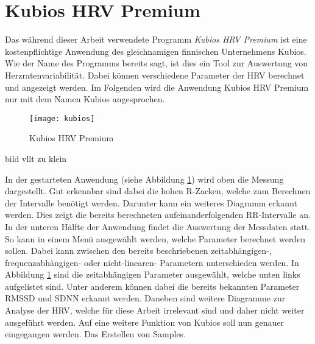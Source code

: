 \section{Kubios HRV Premium}
Das während dieser Arbeit verwendete Programm \textit{Kubios HRV Premium} ist eine kostenpflichtige Anwendung des gleichnamigen finnischen Unternehmens Kubios. Wie der Name des Programms bereits sagt, ist dies ein Tool zur Auswertung von Herzratenvariabilität. Dabei können verschiedene Parameter der HRV berechnet und angezeigt werden.
Im Folgenden wird die Anwendung Kubios HRV Premium nur mit dem Namen Kubios angesprochen. 
 \begin{figure}[H]
	\centering
	\texttt{[image: kubios]}
	\caption{Kubios HRV Premium}
	\label{fig:kubios}
\end{figure}
\todo bild vllt zu klein

In der gestarteten Anwendung (siehe Abbildung \ref{fig:kubios}) wird oben die Messung dargestellt. Gut erkennbar sind dabei die hohen R-Zacken, welche zum Berechnen der Intervalle benötigt werden. Darunter kann ein weiteres Diagramm erkannt werden. Dies zeigt die bereits berechneten aufeinanderfolgenden RR-Intervalle an. In der unteren Hälfte der Anwendung findet die Auswertung der Messdaten statt. So kann in einem Menü ausgewählt werden, welche Parameter berechnet werden sollen. Dabei kann zwischen den bereits beschriebenen zeitabhängigen-, frequenzabhängigen- oder nicht-linearen- Parametern unterschieden werden. In Abbildung \ref{fig:kubios} sind die zeitabhängigen Parameter ausgewählt, welche unten links aufgelistet sind. Unter anderem können dabei die bereits bekannten Parameter RMSSD und SDNN erkannt werden. Daneben sind weitere Diagramme zur Analyse der HRV, welche für diese Arbeit irrelevant sind und daher nicht weiter ausgeführt werden. Auf eine weitere Funktion von Kubios soll nun genauer eingegangen werden. Das Erstellen von Samples. \\

